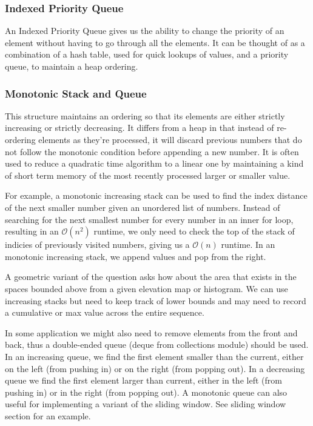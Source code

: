\documentclass{article}
\newcommand{\bigO}{\mathcal{O}}
\begin{document}
    \subsubsection{Indexed Priority Queue}
    An Indexed Priority Queue gives us the ability to change the priority of an element without having to go through all the elements. It can be thought of as a combination of a hash table, used for quick lookups of values, and a priority queue, to maintain a heap ordering.

    \subsubsection{Monotonic Stack and Queue}
    This structure maintains an ordering so that its elements are either strictly increasing or strictly decreasing. It differs from a heap in that instead of re-ordering elements as they're processed, it will discard previous numbers that do not follow the monotonic condition before appending a new number. It is often used to reduce a quadratic time algorithm to a linear one by maintaining a kind of short term memory of the most recently processed larger or smaller value.
    
    For example, a monotonic increasing stack can be used to find the index distance of the next smaller number given an unordered list of numbers. Instead of searching for the next smallest number for every number in an inner for loop, resulting in an $\bigO(n^2)$ runtime, we only need to check the top of the stack of indicies of previously visited numbers, giving us a $\bigO(n)$ runtime. In an monotonic increasing stack, we append values and pop from the right. 
    
    A geometric variant of the question asks how about the area that exists in the spaces bounded above from a given elevation map or histogram. We can use increasing stacks but need to keep track of lower bounds and may need to record a cumulative or max value across the entire sequence.
    
    In some application we might also need to remove elements from the front and back, thus a double-ended queue (deque from collections module) should be used. In an increasing queue, we find the first element smaller than the current, either on the left (from pushing in) or on the right (from popping out). In a decreasing queue we find the first element larger than current, either in the left (from pushing in) or in the right (from popping out). A monotonic queue can also useful for implementing a variant of the sliding window. See sliding window section for an example.
    
\end{document}
